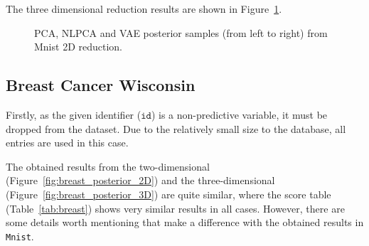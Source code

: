 The three dimensional reduction results are shown in Figure~\ref{fig:mnist_posterior_3D}.
\begin{figure}
  \centering
   \caption{PCA, NLPCA and VAE posterior samples (from left to right) from Mnist 2D reduction.}\label{fig:mnist_posterior_3D}
\end{figure}

\subsection{Breast Cancer Wisconsin}

Firstly, as the given identifier (\(\texttt{id}\)) is a non-predictive variable, it must be dropped from the dataset. Due to the relatively small size to the database, all entries are used in this case.

The obtained results from the two-dimensional (Figure~\ref{fig:breast_posterior_2D}) and the three-dimensional (Figure~\ref{fig:breast_posterior_3D}) are quite similar, where the score table (Table~\ref{tab:breast}) shows very similar results in all cases. However, there are some details worth mentioning that make a difference with the obtained results in \texttt{Mnist}.

